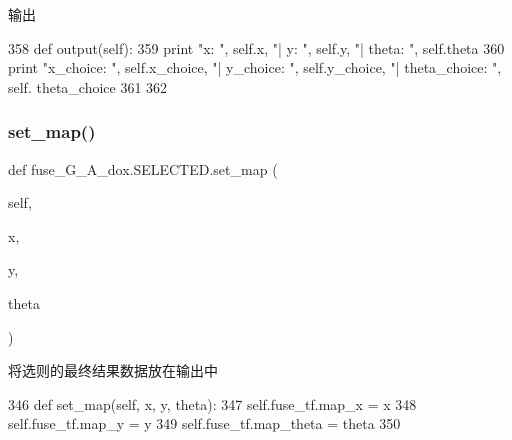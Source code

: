 输出 


\begin{DoxyCode}
358     \textcolor{keyword}{def }output(self):
359         \textcolor{keywordflow}{print} \textcolor{stringliteral}{"x: "}, self.x, \textcolor{stringliteral}{"| y: "}, self.y, \textcolor{stringliteral}{"| theta: "}, self.theta
360         \textcolor{keywordflow}{print} \textcolor{stringliteral}{"x\_choice: "}, self.x\_choice, \textcolor{stringliteral}{"| y\_choice: "}, self.y\_choice, \textcolor{stringliteral}{"| theta\_choice: "}, self.
      theta\_choice
361 
362 
\end{DoxyCode}
\mbox{\label{classfuse___g___a__dox_1_1_s_e_l_e_c_t_e_d_a10e84f2e5b5060a7b09807762ac147ce}} 
\subsubsection{\texorpdfstring{set\+\_\+map()}{set\_map()}}
{\footnotesize\ttfamily def fuse\+\_\+\+G\+\_\+\+A\+\_\+dox.\+S\+E\+L\+E\+C\+T\+E\+D.\+set\+\_\+map (\begin{DoxyParamCaption}\item[{}]{self,  }\item[{}]{x,  }\item[{}]{y,  }\item[{}]{theta }\end{DoxyParamCaption})}



将选则的最终结果数据放在输出中 


\begin{DoxyCode}
346     \textcolor{keyword}{def }set\_map(self, x, y, theta):
347         self.fuse\_tf.map\_x = x
348         self.fuse\_tf.map\_y = y
349         self.fuse\_tf.map\_theta = theta
350 
\end{DoxyCode}
\mbox{\label{classfuse___g___a__dox_1_1_s_e_l_e_c_t_e_d_aa57c55051e01b06fb42bf4c0fb37772f}} 
